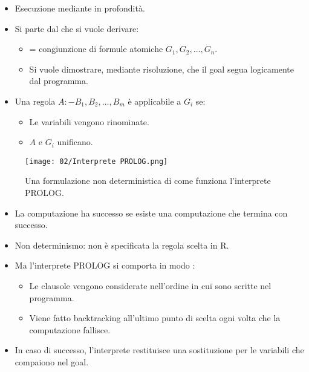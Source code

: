 \begin{itemize}
  \item Esecuzione mediante  in profondità. 
  \item Si parte dal  che si vuole derivare: 
    \begin{itemize}
      \item {} = congiunzione di formule atomiche $G_1, G_2, \dots, G_n$. 
      \item Si vuole dimostrare, mediante risoluzione, che il goal segua logicamente dal programma. 
    \end{itemize}
  \item Una regola $A :- B_1, B_2, \dots, B_m$ è applicabile a $G_i$ se: 
    \begin{itemize}
      \item Le variabili vengono rinominate. 
      \item $A$ e $G_i$ unificano. 
    \end{itemize}
\end{itemize}

\begin{figure}[h]
    \centering
    \texttt{[image: 02/Interprete PROLOG.png]}
    \caption{Una formulazione non deterministica di come funziona l'interprete PROLOG.}
\end{figure}


\begin{itemize}
  \item La computazione ha successo se esiste una computazione che
termina con successo. 
\item Non determinismo: non è specificata la regola scelta in R. 
\item Ma l'interprete PROLOG si comporta in modo : 
  \begin{itemize}
    \item Le clausole vengono considerate nell’ordine in cui sono scritte
nel programma. 
\item Viene fatto backtracking all’ultimo punto di scelta ogni volta
che la computazione fallisce.
  \end{itemize}
\item In caso di successo, l’interprete restituisce una sostituzione per le
variabili che compaiono nel goal.
\end{itemize}

